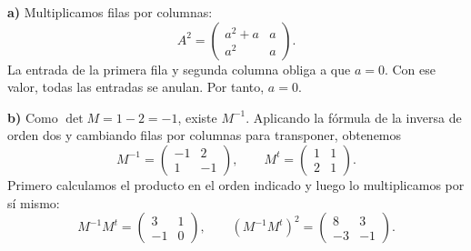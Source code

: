 \textbf{a)} Multiplicamos filas por columnas:
\[
 A^2=\begin{pmatrix}a^2+a&a\\a^2&a\end{pmatrix}.
\]
La entrada de la primera fila y segunda columna obliga a que $a=0$. Con ese valor, todas las entradas se anulan. Por tanto, $\boxed{a=0}$.

\textbf{b)} Como $\det M=1-2=-1$, existe $M^{-1}$. Aplicando la fórmula de la inversa de orden dos y cambiando filas por columnas para transponer, obtenemos
\[
 M^{-1}=\begin{pmatrix}-1&2\\1&-1\end{pmatrix},
 \qquad M^t=\begin{pmatrix}1&1\\2&1\end{pmatrix}.
\]
Primero calculamos el producto en el orden indicado y luego lo multiplicamos por sí mismo:
\[
 M^{-1}M^t=\begin{pmatrix}3&1\\-1&0\end{pmatrix},
 \qquad (M^{-1}M^t)^2=\boxed{\begin{pmatrix}8&3\\-3&-1\end{pmatrix}}.
\]
